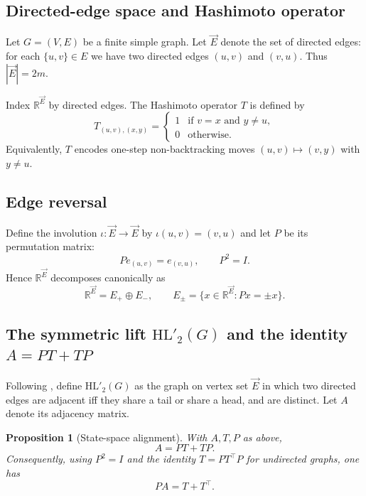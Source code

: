 \documentclass[11pt]{article}
\newtheorem{proposition}{Proposition}
\begin{document}
\subsection{Directed-edge space and Hashimoto operator}

Let $G=(V,E)$ be a finite simple graph. Let $\vec E$ denote the set of directed edges:
for each $\{u,v\}\in E$ we have two directed edges $(u,v)$ and $(v,u)$. Thus $|\vec E|=2m$.

Index $\mathbb R^{\vec E}$ by directed edges. The Hashimoto operator $T$ is defined by
\[
T_{(u,v),(x,y)}=
\begin{cases}
1 &\text{if } v=x \text{ and } y\neq u,\\
0 &\text{otherwise.}
\end{cases}
\]
Equivalently, $T$ encodes one-step non-backtracking moves $(u,v)\mapsto(v,y)$ with $y\neq u$.

\subsection{Edge reversal}

Define the involution $\iota:\vec E\to\vec E$ by $\iota(u,v)=(v,u)$ and let $P$ be its permutation matrix:
\[
P e_{(u,v)} = e_{(v,u)},\qquad P^2=I.
\]
Hence $\mathbb R^{\vec E}$ decomposes canonically as
\[
\mathbb R^{\vec E}=E_+\oplus E_-,
\qquad
E_\pm = \{x\in\mathbb R^{\vec E}:Px=\pm x\}.
\]

\subsection{The symmetric lift $\mathrm{HL}'_2(G)$ and the identity $A=PT+TP$}

Following \cite{BalHL2}, define $\mathrm{HL}'_2(G)$ as the graph on vertex set $\vec E$ in which two directed edges are adjacent iff they share a tail or share a head, and are distinct. Let $A$ denote its adjacency matrix.

\begin{proposition}[State-space alignment]\label{prop:APTTP}
With $A,T,P$ as above,
\[
A = PT + TP.
\]
Consequently, using $P^2=I$ and the identity $T = PT^\top P$ for undirected graphs, one has
\[
PA = T+T^\top.
\]
\end{proposition}
\end{document}
